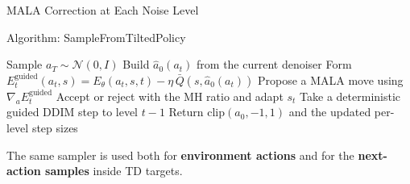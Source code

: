 \documentclass[final,hyperref={pdfpagelabels=false}]{beamer}
\newlength{\colwidth}
\begin{document}
\begin{frame}[t]
\begin{columns}[t]
\begin{column}{\colwidth}
\begin{block}{\Large MALA Correction at Each Noise Level}
\vspace{0.4em}
\begin{center}
\end{center}
\end{block}

\vspace{0.8cm}

\begin{block}{\Large Algorithm: SampleFromTiltedPolicy}
\footnotesize
\begin{algorithmic}[1]
\STATE Sample $a_T\sim\mathcal{N}(0,I)$
  \STATE Build $\hat a_0(a_t)$ from the current denoiser
  \STATE Form $E_t^{\mathrm{guided}}(a_t,s)=E_\theta(a_t,s,t)-\eta\,\bar Q(s,\hat a_0(a_t))$
    \STATE Propose a MALA move using $\nabla_a E_t^{\mathrm{guided}}$
    \STATE Accept or reject with the MH ratio and adapt $s_t$
  \ENDFOR
  \STATE Take a deterministic guided DDIM step to level $t-1$
\ENDFOR
\STATE Return $\mathrm{clip}(a_0,-1,1)$ and the updated per-level step sizes
\end{algorithmic}

\vspace{0.4em}
The same sampler is used both for \textbf{environment actions} and for the \textbf{next-action samples} inside TD targets.
\end{block}

\vspace{0.8cm}


\end{column}
\end{columns}
\end{frame}
\end{document}
